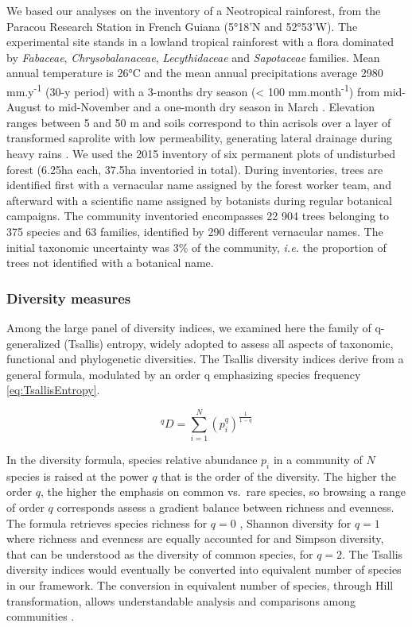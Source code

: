 \documentclass[
  11pt,
  french,
  A4paper,
  extrafontsizes,onecolumn,openright
  ]{memoir}
\begin{document}
We based our analyses on the inventory of a Neotropical rainforest, from
the Paracou Research Station in French Guiana (5°18'N and 52°53'W). The
experimental site stands in a lowland tropical rainforest with a flora
dominated by \emph{Fabaceae}, \emph{Chrysobalanaceae},
\emph{Lecythidaceae} and \emph{Sapotaceae} families. Mean annual
temperature is 26°C and the mean annual precipitations average 2980
mm.y\textsuperscript{-1} (30-y period) with a 3-months dry season
(\textless{} 100 mm.month\textsuperscript{-1}) from mid-August to
mid-November and a one-month dry season in March \autocite{Wagner2011}.
Elevation ranges between 5 and 50 m and soils correspond to thin
acrisols over a layer of transformed saprolite with low permeability,
generating lateral drainage during heavy rains
\autocite{IUSSWorkingGroupWRB2015}. We used the 2015 inventory of six
permanent plots of undisturbed forest (6.25ha each, 37.5ha inventoried
in total). During inventories, trees are identified first with a
vernacular name assigned by the forest worker team, and afterward with a
scientific name assigned by botanists during regular botanical
campaigns. The community inventoried encompasses 22 904 trees belonging
to 375 species and 63 families, identified by 290 different vernacular
names. The initial taxonomic uncertainty was 3\% of the community,
\emph{i.e.} the proportion of trees not identified with a botanical
name.

\subsubsection{Diversity measures}\label{diversity-measures}

Among the large panel of diversity indices, we examined here the family
of q-generalized (Tsallis) entropy, widely adopted to assess all aspects
of taxonomic, functional and phylogenetic diversities. The Tsallis
diversity indices derive from a general formula, modulated by an order q
emphasizing species frequency \eqref{eq:TsallisEntropy}.

\begin{equation}
^qD = \sum_{i=1}^{N}{\left( p_i^q \right)^{\frac{1}{1-q}} }
\label{eq:TsallisEntropy}
\end{equation}

In the diversity formula, species relative abundance \(p_i\) in a
community of \(N\) species is raised at the power \(q\) that is the
order of the diversity. The higher the order \(q\), the higher the
emphasis on common vs.~rare species, so browsing a range of order \(q\)
corresponds assess a gradient balance between richness and evenness. The
formula retrieves species richness for \(q = 0\) , Shannon diversity for
\(q = 1\) where richness and evenness are equally accounted for and
Simpson diversity, that can be understood as the diversity of common
species, for \(q = 2\). The Tsallis diversity indices would eventually
be converted into equivalent number of species in our framework. The
conversion in equivalent number of species, through Hill transformation,
allows understandable analysis and comparisons among communities
\autocites{Hill1973}{Keylock2005}{Jost2006}.
\end{document}
